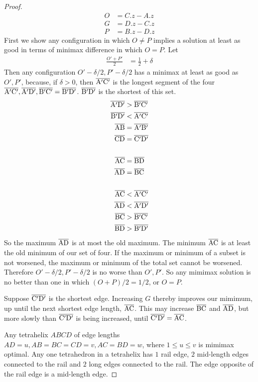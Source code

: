 \documentclass[11pt]{article}
\begin{document}
  \begin{proof}
\begin{align*}
  O  &= C.z - A.z \\
  G &= D.z - C.z \\
  P &=  B.z - D.z
\end{align*}
First we show any configuration in which $O \neq P$ implies a solution at least as good in terms of minimax difference in which $O = P$.
Let 
\begin{align*}
  \frac{O' + P'}{2} &= \frac{1}{2} + \delta
\end{align*}
Then any configuration $O' - \delta/2, P' - \delta/2$ has a minimax at least as good as $O',P'$, because, if $\delta > 0$, then
$\overline{\rm A'C'}$ is the longest segment of the four $\overline{\rm A'C'}, \overline{\rm A'D'}, \overline{\rm B'C'} =  \overline{\rm B'D'} $.
$\overline{\rm B'D'}$ is the shortest of this set.
\begin{align*}
  \overline{\rm A'D'} &> \overline{\rm B'C'}  \\
   \overline{\rm B'D'} &< \overline{\rm A'C'}  \\  
   \overline{\rm AB} &=   \overline{\rm A'B'}   \\
   \overline{\rm CD} &=   \overline{\rm C'D'}   \\
  \\
   \overline{\rm AC} &=   \overline{\rm BD}   \\
   \overline{\rm AD} &=   \overline{\rm BC}   \\
  \\  
   \overline{\rm AC} &<  \overline{\rm A'C'} \\
   \overline{\rm AD} &< \overline{\rm A'D'}   \\
   \overline{\rm BC} &>  \overline{\rm B'C'} \\
   \overline{\rm BD} &> \overline{\rm B'D'}   \\
\end{align*}
So the maximum $\overline{\rm AD}$ is at most the old maximum. The minimum $\overline{\rm AC}$ is at least the old minimum of our set of four.
If the maximum or minimum of a subset is not worsened, the maximum or minimum of the total set cannot be worsened. Therefore $O' - \delta/2, P' - \delta/2$
is no worse than $O', P'$. So any mimimax solution is no better than one in which $(O + P)/2 = 1/2$, or $O = P$.

Suppose $\overline{\rm C'D'}$ is the shortest edge. Increasing $G$ thereby improves our mimimum, up until the next shortest edge length, $\overline{\rm AC}$.
This may increase $\overline{\rm BC}$ and $\overline{\rm AD}$, but more slowly than $\overline{\rm C'D'}$ is being increased, until  $\overline{\rm C'D'} =
\overline{\rm AC}$.

  Any tetrahelix $ABCD$ of edge lengths $AD = u, AB = BC = CD = v , AC = BD = w$, where $1 \leq u \leq v$ is mimimax optimal.
  Any one tetrahedron in a tetrahelix has $1$ rail edge, $2$ mid-length edges connected to the rail and $2$ long edges connected to the rail.
  The edge opposite of the rail edge is a mid-length edge.
    \end{proof}
\end{document}
